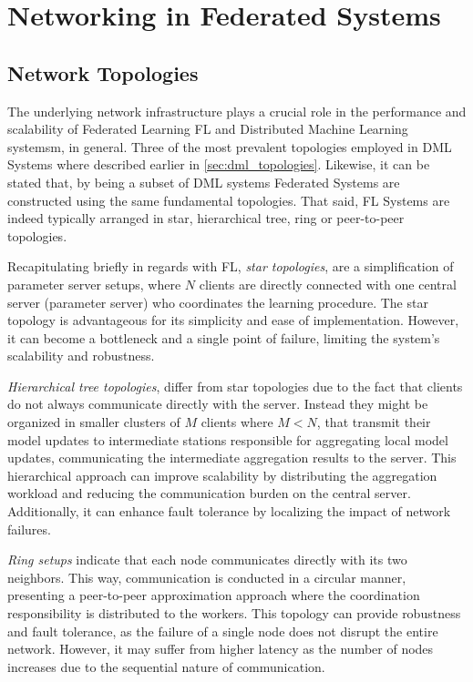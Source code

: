 \section{Networking in Federated Systems}
\subsection{Network Topologies}
\label{sec:fl_topologies}
The underlying network infrastructure plays a crucial role in the performance and scalability of Federated Learning FL and
Distributed Machine Learning systemsm, in general. Three of the most prevalent topologies employed in DML Systems where described
earlier in \cref{sec:dml_topologies}. Likewise, it can be stated that, by being a subset of DML systems Federated Systems are
constructed using the same fundamental topologies. That said, FL Systems are indeed typically arranged in star, hierarchical
tree, ring or peer-to-peer topologies.

Recapitulating briefly in regards with FL, \emph{star topologies}, are a simplification of parameter server setups, where $N$ clients are directly
connected with one central server (parameter server) who coordinates the learning procedure. The star topology is advantageous for its
simplicity and ease of implementation. However, it can become a bottleneck and a single point of failure, limiting the system's scalability and
robustness.

\emph{Hierarchical tree topologies}, differ from star topologies due to the fact that clients do not always communicate directly with the server.
Instead they might be organized in smaller clusters of $M$ clients where $M < N$, that transmit their model updates to intermediate stations
responsible for aggregating local model updates, communicating the intermediate aggregation results to the server.
This hierarchical approach can improve scalability by distributing the aggregation workload and reducing the communication burden on the central
server. Additionally, it can enhance fault tolerance by localizing the impact of network failures.

\emph{Ring setups} indicate that each node communicates directly with its two neighbors. This way, communication is conducted in a circular manner,
presenting a peer-to-peer approximation approach where the coordination responsibility is distributed to the workers. This topology can provide
robustness and fault tolerance, as the failure of a single node does not disrupt the entire network. However, it may suffer from higher latency
as the number of nodes increases due to the sequential nature of communication.

